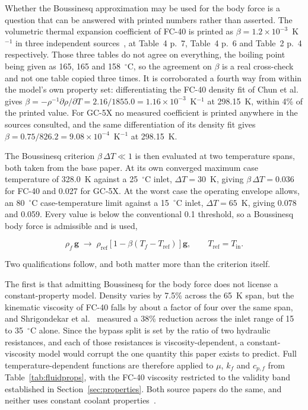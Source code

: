 Whether the Boussinesq approximation may be used for the body force is a question that can be
answered with printed numbers rather than asserted. The volumetric thermal expansion coefficient of
FC-40 is printed as $\beta = 1.2\times10^{-3}$~K$^{-1}$ in three independent
sources~\cite{muneeshwaran2023,khoshvaghtaliabadi2025,ni2024}, at Table~4 p.~7, Table~4 p.~6 and
Table~2 p.~4 respectively. Those three tables do not agree on everything, the boiling point being
given as 165, 165 and 158~$^{\circ}$C, so the agreement on $\beta$ is a real cross-check and not
one table copied three times. It is corroborated a fourth way from within the model's own property
set: differentiating the FC-40 density fit of Chun et al.~\cite{chun2026} gives
$\beta = -\rho^{-1}\partial\rho/\partial T = 2.16/1855.0 = 1.16\times10^{-3}$~K$^{-1}$ at
298.15~K, within 4\% of the printed value. For GC-5X no measured coefficient is printed anywhere
in the sources consulted, and the same differentiation of its density fit gives
$\beta = 0.75/826.2 = 9.08\times10^{-4}$~K$^{-1}$ at 298.15~K.

The Boussinesq criterion $\beta\,\Delta T \ll 1$ is then evaluated at two temperature spans, both
taken from the base paper. At its own converged maximum case temperature of 328.0~K against a
25~$^{\circ}$C inlet, $\Delta T = 30$~K, giving $\beta\,\Delta T = 0.036$ for FC-40 and 0.027 for
GC-5X. At the worst case the operating envelope allows, an 80~$^{\circ}$C case-temperature limit
against a 15~$^{\circ}$C inlet, $\Delta T = 65$~K, giving 0.078 and 0.059. Every value is below
the conventional 0.1 threshold, so a Boussinesq body force is admissible and is used,

\begin{equation}
\rho_f \, \mathbf{g} \;\longrightarrow\;
\rho_{\mathrm{ref}} \left[ 1 - \beta \left( T_f - T_{\mathrm{ref}} \right) \right] \mathbf{g} ,
\qquad T_{\mathrm{ref}} = T_{\mathrm{in}} .
\label{eq:boussinesq}
\end{equation}

Two qualifications follow, and both matter more than the criterion itself.

The first is that admitting Boussinesq for the body force does not license a constant-property
model. Density varies by 7.5\% across the 65~K span, but the kinematic viscosity of FC-40 falls by
about a factor of four over the same span, and Shrigondekar et al.~\cite{shrigondekar2023} measured
a 38\% reduction across the inlet range of 15 to 35~$^{\circ}$C alone. Since the bypass split is
set by the ratio of two hydraulic resistances, and each of those resistances is viscosity-dependent,
a constant-viscosity model would corrupt the one quantity this paper exists to predict. Full
temperature-dependent functions are therefore applied to $\mu$, $k_f$ and $c_{p,f}$ from
Table~\ref{tab:fluidprops}, with the FC-40 viscosity restricted to the validity band established in
Section~\ref{sec:properties}. Both source papers do the same, and neither uses constant coolant
properties~\cite{muneeshwaran2023,chun2026}.

